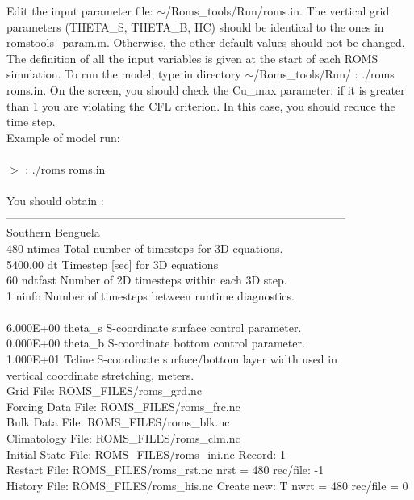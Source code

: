 Edit the input parameter file: $\sim$/Roms\_tools/Run/roms.in.
The vertical grid parameters (THETA\_S,   THETA\_B,   HC)
should be identical to the ones in romstools\_param.m.
Otherwise, the other default values should not be changed.
The definition of all the input variables is given at the start of each ROMS
simulation.
To run the model, type in directory $\sim$/Roms\_tools/Run/ : ./roms roms.in.
On the screen, you should check the Cu\_max parameter: if it is greater than
1 you are violating the CFL criterion. In this case, you should reduce the 
time step.
\\
Example of model run:\\
\\
$>$ : ./roms roms.in
\\\\
You should obtain :\\
------------------------------------------------------------------------------------------\\
 Southern Benguela\\
       480  ntimes   Total number of timesteps for 3D equations.\\
   5400.00  dt       Timestep [sec] for 3D equations\\
        60  ndtfast  Number of 2D timesteps within each 3D step.\\
         1  ninfo    Number of timesteps between runtime diagnostics.\\
\\
 6.000E+00  theta\_s  S-coordinate surface control parameter.\\
 0.000E+00  theta\_b  S-coordinate bottom control parameter.\\
 1.000E+01  Tcline   S-coordinate surface/bottom layer width used in\\
                                vertical coordinate stretching, meters.\\
          Grid File:  ROMS\_FILES/roms\_grd.nc\\
  Forcing Data File:  ROMS\_FILES/roms\_frc.nc\\
     Bulk Data File:  ROMS\_FILES/roms\_blk.nc\\
   Climatology File:  ROMS\_FILES/roms\_clm.nc\\
 Initial State File:  ROMS\_FILES/roms\_ini.nc    Record:  1\\
       Restart File:  ROMS\_FILES/roms\_rst.nc    nrst =   480    rec/file:   -1\\
       History File:  ROMS\_FILES/roms\_his.nc  Create new: T  nwrt = 480  rec/file =  0\\

